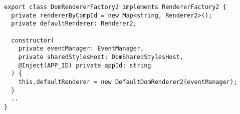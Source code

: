 \begin{verbatim}
export class DomRendererFactory2 implements RendererFactory2 {
  private rendererByCompId = new Map<string, Renderer2>();
  private defaultRenderer: Renderer2;

  constructor(
    private eventManager: EventManager,
    private sharedStylesHost: DomSharedStylesHost,
    @Inject(APP_ID) private appId: string
  ) {
    this.defaultRenderer = new DefaultDomRenderer2(eventManager);
  }
  ..
}
\end{verbatim}
